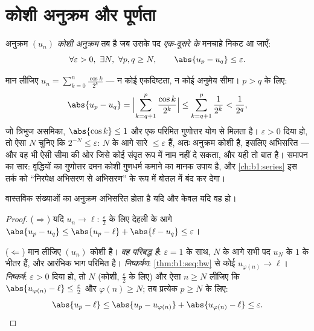 \section{कोशी अनुक्रम और पूर्णता}

\begin{definition}\label{def:b1:seq:cauchy}
अनुक्रम $(u_n)$ \emph{कोशी अनुक्रम} तब है जब उसके पद
\emph{एक-दूसरे के} मनचाहे निकट आ जाएँ:
\[
\forall \varepsilon > 0,\ \exists N,\ \forall p, q \geq N,
\qquad \abs{u_p - u_q} \leq \varepsilon .
\]
\end{definition}

\begin{example}\label{ex:b1:seq:cauchyhand}
मान लीजिए $u_n = \sum_{k=0}^{n} \frac{\cos k}{2^k}$ --- न कोई एकदिष्टता, न
कोई अनुमेय सीमा। $p > q$ के लिए:
\[
\abs{u_p - u_q}
= \Bigl| \sum_{k=q+1}^{p} \frac{\cos k}{2^k} \Bigr|
\leq \sum_{k=q+1}^{p} \frac{1}{2^k}
< \frac{1}{2^{q}} ,
\]
जो त्रिभुज असमिका, $\abs{\cos k} \leq 1$ और एक परिमित गुणोत्तर योग से मिलता
है। $\varepsilon > 0$ दिया हो, तो ऐसा $N$ चुनिए कि $2^{-N} \leq
\varepsilon$: $N$ के आगे सारे  $\leq \varepsilon$ हैं, अतः अनुक्रम
कोशी है, इसलिए अभिसरित --- और वह भी ऐसी सीमा की ओर जिसे कोई संवृत रूप में
नाम नहीं दे सकता, और यही तो बात है। समापन का सार: वृद्धियों का गुणोत्तर दमन
कोशी गुणधर्म कमाने का मानक उपाय है, और \cref{ch:b1:series} इस तर्क को
``निरपेक्ष अभिसरण से अभिसरण'' के रूप में बोतल में बंद कर देगा।
\end{example}

\begin{theorem}[$\R$ की पूर्णता]\label{thm:b1:seq:complete}
वास्तविक संख्याओं का अनुक्रम अभिसरित होता है यदि और केवल यदि वह 
हो।
\end{theorem}

\begin{proof}
($\Rightarrow$) यदि $u_n \to \ell$: $\frac\varepsilon2$ के लिए देहली के आगे
$\abs{u_p - u_q} \leq \abs{u_p - \ell} + \abs{\ell - u_q} \leq \varepsilon$।

($\Leftarrow$) मान लीजिए $(u_n)$ कोशी है। \emph{वह परिबद्ध है}: $\varepsilon
= 1$ के साथ, $N$ के आगे सभी पद $u_N$ के $1$ के भीतर हैं, और आरंभिक भाग
परिमित है। \emph{निष्कर्षण}: \cref{thm:b1:seq:bw} से कोई 
$u_{\varphi(n)} \to \ell$। \emph{निष्कर्ष}: $\varepsilon > 0$ दिया हो, तो
$N$ (कोशी, $\frac\varepsilon2$ के लिए) और ऐसा $n \geq N$ लीजिए कि
$\abs{u_{\varphi(n)} - \ell} \leq \frac\varepsilon2$ और $\varphi(n) \geq N$;
तब प्रत्येक $p \geq N$ के लिए:
\[
\abs{u_p - \ell} \leq \abs{u_p - u_{\varphi(n)}} +
\abs{u_{\varphi(n)} - \ell} \leq \varepsilon . \qedhere
\]
\end{proof}

